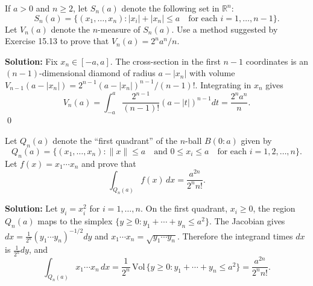 \begin{problembox}
If \( a > 0 \) and \( n \geq 2 \), let \( S_n(a) \) denote the following set in \( \mathbb{R}^n \):
\[
S_n(a) = \{(x_1, \ldots, x_n): |x_i| + |x_n| \leq a \quad \text{for each } i = 1, \ldots, n - 1\}.
\]
Let \( V_n(a) \) denote the \( n \)-measure of \( S_n(a) \). Use a method suggested by Exercise 15.13 to prove that \( V_n(a) = 2^n a^n / n \).
\end{problembox}

\noindent\textbf{Solution:}
Fix \(x_n\in[-a,a]\). The cross-section in the first \(n-1\) coordinates is an \((n-1)\)-dimensional diamond of radius \(a-|x_n|\) with volume \(V_{n-1}(a-|x_n|)=2^{n-1}(a-|x_n|)^{n-1}/(n-1)!\). Integrating in \(x_n\) gives
\[
V_n(a)=\int_{-a}^{a} \frac{2^{n-1}}{(n-1)!} (a-|t|)^{n-1} dt = \frac{2^n a^n}{n}.
\]\qed


\begin{problembox}
Let \( Q_n(a) \) denote the ``first quadrant'' of the \( n \)-ball \( B(0:a) \) given by
\[
Q_n(a) = \{(x_1, \ldots, x_n): \|x\| \leq a \quad \text{and } 0 \leq x_i \leq a \quad \text{for each } i = 1, 2, \ldots, n\}.
\]
Let \( f(x) = x_1 \cdots x_n \) and prove that
\[
\int_{Q_n(a)} f(x) \, dx = \frac{a^{2n}}{2^n n!}.
\]
\end{problembox}

\noindent\textbf{Solution:}
Let \(y_i=x_i^2\) for \(i=1,\ldots,n\). On the first quadrant, \(x_i\ge 0\), the region \(Q_n(a)\) maps to the simplex \(\{y\ge 0: y_1+\cdots+y_n\le a^2\}\). The Jacobian gives \(dx=\frac{1}{2^n}(y_1\cdots y_n)^{-1/2}dy\) and \(x_1\cdots x_n=\sqrt{y_1\cdots y_n}\). Therefore the integrand times \(dx\) is \(\frac{1}{2^n} dy\), and
\[
\int_{Q_n(a)} x_1\cdots x_n\,dx = \frac{1}{2^n}\,\mathrm{Vol}\,\{y\ge 0: y_1+\cdots+y_n\le a^2\} = \frac{a^{2n}}{2^n n!}.
\]